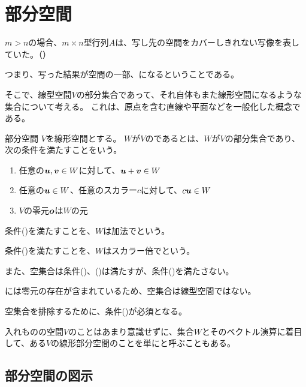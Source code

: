 \documentclass[../../../topic_linear-algebra]{subfiles}
\begin{document}
\sectionline
\section{部分空間}

$m > n$の場合、$m \times n$型行列$A$は、写し先の空間をカバーしきれない写像を表していた。（）

つまり、写った結果が空間の一部、になるということである。

\br

そこで、線型空間$V$の部分集合であって、それ自体もまた線形空間になるような集合について考える。
これは、原点を含む直線や平面などを一般化した概念である。

\begin{definition*}{部分空間}
  $V$を線形空間とする。
  $W$が$V$のであるとは、$W$が$V$の部分集合であり、次の条件を満たすことをいう。
  \begin{enumerate}[label=\romanlabel]
    \item 任意の$\vb*{u}, \vb*{v} \in W$に対して、$\vb*{u} + \vb*{v} \in W$
    \item 任意の$\vb*{u} \in W$、任意のスカラー$c$に対して、$c \vb*{u} \in W$
    \item $V$の零元$\vb*{o}$は$W$の元
  \end{enumerate}
\end{definition*}

条件()を満たすことを、$W$は加法でという。

条件()を満たすことを、$W$はスカラー倍でという。

\br

また、空集合は条件()、()は満たすが、条件()を満たさない。

には零元の存在が含まれているため、空集合は線型空間ではない。

空集合を排除するために、条件()が必須となる。

\br

入れものの空間$V$のことはあまり意識せずに、集合$W$とそのベクトル演算に着目して、ある$V$の線形部分空間のことを単にと呼ぶこともある。

\subsection{部分空間の図示}
\end{document}
